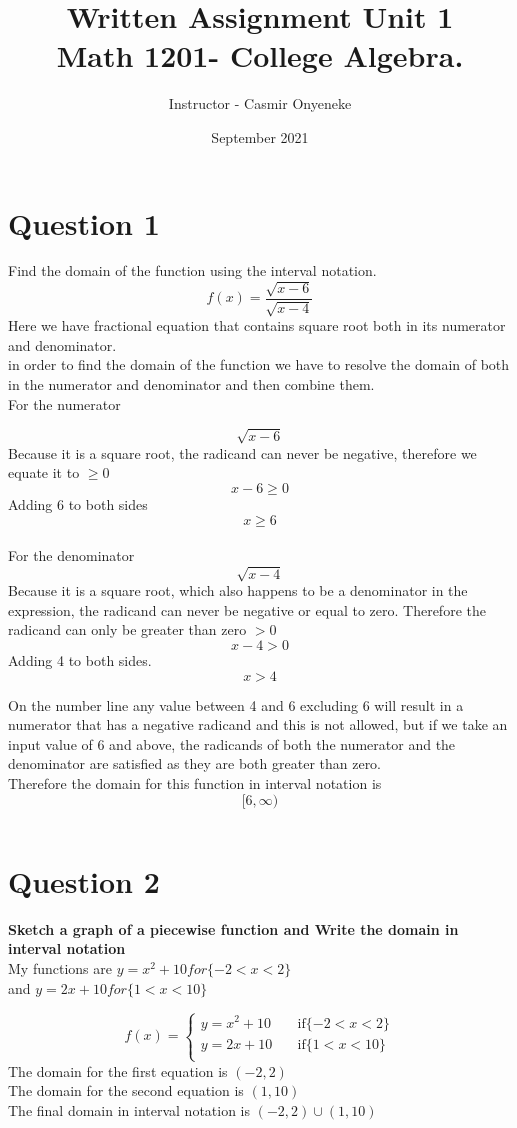 \documentclass{article}
\title{Written Assignment Unit 1\\
Math 1201- College Algebra.
}
\author{Instructor - Casmir Onyeneke}
\date{September 2021}
\begin{document}
\maketitle

\section*{Question 1}
Find the domain of the function using the interval notation.
$${f(x) = \frac{\sqrt{x-6}}{\sqrt{x-4}}}$$
Here we have fractional equation that contains square root both in its numerator and denominator.\\
in order to find the domain of the function we have to resolve the domain of both in the numerator and denominator and then combine them.\\

For the numerator

$${\sqrt{x-6}}$$
Because it is a square root, the radicand can never be negative, therefore we equate it to ${\ge 0}$
$${x - 6 \ge 0}$$
Adding 6 to both sides
$${x\ge6}$$\\

For the denominator
$${\sqrt{x-4}}$$
Because it is a square root, which also happens to be a denominator in the expression, the radicand can never be negative or equal to zero. Therefore the radicand can only be greater than zero ${> 0}$
$${x-4>0}$$
Adding 4 to both sides.
$${x > 4}$$

On the number line any value between 4 and 6 excluding 6 will result in a numerator that has a negative radicand and this is not allowed, but if we take an input value of 6 and above, the radicands of both the numerator and the denominator are satisfied as they are both greater than zero.\\
Therefore the domain for this function in interval notation is  $$[6,\infty)$$




$${}$$


\section*{Question 2}
\textbf{Sketch a graph of a piecewise function and Write the domain in interval notation}\\
My functions are ${y = x^2 + 10  for  \{-2<x<2\}}$\\
and ${y = 2x+10 for \{1<x<10\}}$

\begin{equation*}
    f(x)=\begin{cases}
            y = x^2 + 10  \quad & \text{if}  \{-2<x<2\} \\
            y = 2x+10 \quad & \text{if} \{1<x<10\} \\
        \end{cases}
    \end{equation*}
The domain for the first equation is ${(-2,2)}$\\
The domain for the second equation is  ${(1,10)}$\\
The final domain in interval notation is ${(-2,2)\cup(1,10)}$
\end{document}
